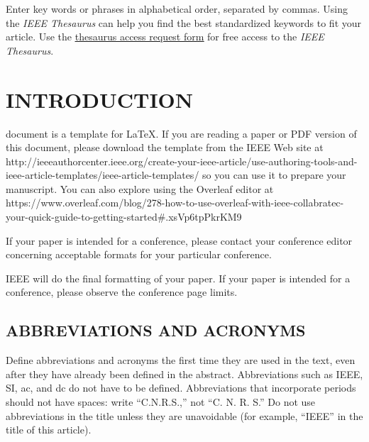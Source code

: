 \documentclass{ieeetmlcn}
\begin{document}
\begin{IEEEkeywords}
Enter key words or phrases in alphabetical order, separated by
commas. Using the \textit{IEEE Thesaurus} can help you find the best
standardized keywords to fit your article. Use the \underline{\href{https://www.ieee.org/publications/services/thesaurus.html}{thesaurus
access request form}} for free access to the \textit{IEEE Thesaurus}.
\end{IEEEkeywords}


\maketitle

\section{INTRODUCTION}
 document is a template for \LaTeX. If you are
reading a paper or PDF version of this document, please download the
template from the IEEE Web site at 
http://\discretionary{}{}{}ieeeauthorcenter.ieee.org/\discretionary{}{}{}create-your-ieee-article/\discretionary{}{}{}use-authoring-tools-and-ieee-article-templates/\discretionary{}{}{}ieee-article-templates/
so you can use it to prepare your manuscript.
You can also explore using the Overleaf editor at
https://\discretionary{}{}{}www.overleaf.com/\discretionary{}{}{}blog/\discretionary{}{}{}278-how-to-use-overleaf-with-ieee-collabratec-your-quick-guide-to-getting-started\discretionary{}{}{}\#.xsVp6tpPkrKM9

If your paper is intended for a conference, please contact your conference
editor concerning acceptable formats for your particular
conference.

IEEE will do the final formatting of your paper. If your paper is intended
for a conference, please observe the conference page limits.

\subsection{ABBREVIATIONS AND ACRONYMS}
Define abbreviations and acronyms the first time they are used in the text,
even after they have already been defined in the abstract. Abbreviations
such as IEEE, SI, ac, and dc do not have to be defined. Abbreviations that
incorporate periods should not have spaces: write ``C.N.R.S.,'' not ``C. N.
R. S.'' Do not use abbreviations in the title unless they are unavoidable
(for example, ``IEEE'' in the title of this article).
\end{document}
